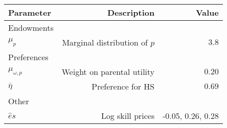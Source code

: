 \begin{tabular}{lrr}
\hline
Parameter & Description  & Value  \\
\hline
Endowments &   &   \\
$\mu_{p}$ & Marginal distribution of $p$  & $3.8$  \\
Preferences &   &   \\
$\mu_{\omega,p}$ & Weight on parental utility  & $0.20$  \\
$\bar{\eta}$ & Preference for HS  & $0.69$  \\
Other &   &   \\
$\hat{e}{s}$ & Log skill prices  & -0.05, 0.26, 0.28  \\
\hline
\end{tabular}%
